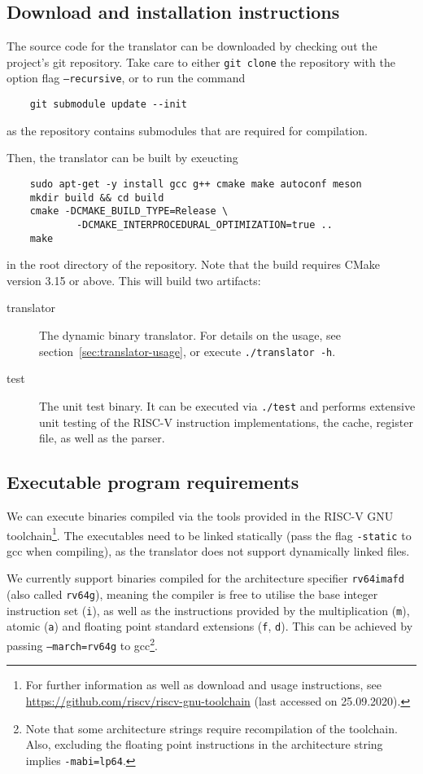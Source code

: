 \subsection{Download and installation instructions}
The source code for the translator can be downloaded by checking out the project's git repository.
Take care to either \texttt{git clone} the repository with the option flag \texttt{--recursive}, or to run the command
\begin{lstlisting}
	git submodule update --init
\end{lstlisting}
as the repository contains submodules that are required for compilation.

Then, the translator can be built by exeucting
\begin{lstlisting}
	sudo apt-get -y install gcc g++ cmake make autoconf meson
	mkdir build && cd build
	cmake -DCMAKE_BUILD_TYPE=Release \
			-DCMAKE_INTERPROCEDURAL_OPTIMIZATION=true ..
	make
\end{lstlisting}
in the root directory of the repository.
Note that the build requires CMake version 3.15 or above.
This will build two artifacts:
\begin{description}
	\item[translator] The dynamic binary translator.
	For details on the usage, see section~\ref{sec:translator-usage}, or execute \texttt{./translator -h}.
	
	\item[test] The unit test binary.
	It can be executed via \texttt{./test} and performs extensive unit testing of the RISC-V instruction implementations, the cache, register file, as well as the parser.
\end{description}

\subsection{Executable program requirements}
We can execute binaries compiled via the tools provided in the RISC-V GNU toolchain\footnote{For further information as well as download and usage instructions, see \url{https://github.com/riscv/riscv-gnu-toolchain} (last accessed on 25.09.2020).}.
The executables need to be linked statically (pass the flag \texttt{-static} to gcc when compiling), as the translator does not support dynamically linked files.

We currently support binaries compiled for the architecture specifier \texttt{rv64imafd} (also called \texttt{rv64g}), meaning the compiler is free to utilise the base integer instruction set (\texttt{i}), as well as the instructions provided by the multiplication (\texttt{m}), atomic (\texttt{a}) and floating point standard extensions (\texttt{f}, \texttt{d}).
This can be achieved by passing \texttt{--march=rv64g} to gcc\footnote{Note that some architecture strings require recompilation of the toolchain. Also, excluding the floating point instructions in the architecture string implies \texttt{-mabi=lp64}.}.


